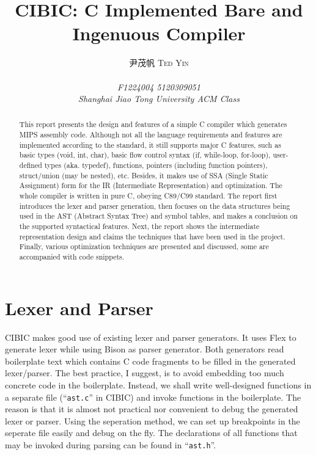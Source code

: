 \documentclass[10pt, a4paper]{article}
\begin{document}
\title{\Large{CIBIC: C Implemented Bare and Ingenuous Compiler}}

\author{\textsc{尹茂帆 Ted Yin}\\ \\
    {\centering\emph{F1224004 5120309051\\
Shanghai Jiao Tong University ACM Class}}}
\maketitle
\begin{abstract}
    This report presents the design and features of a simple C compiler which
    generates MIPS assembly code. Although not all the language requirements
    and features are implemented according to the standard, it still supports
    major C features, such as basic types (void, int, char), basic flow control
    syntax (if, while-loop, for-loop), user-defined types (aka. typedef),
    functions, pointers (including function pointers), struct/union (may be
    nested), etc. Besides, it makes use of SSA (Single Static Assignment) form
    for the IR (Intermediate Representation) and optimization. The whole compiler is
    written in pure C, obeying C89/C99 standard. The report first introduces
    the lexer and parser generation, then focuses on the data structures being
    used in the AST (Abstract Syntax Tree) and symbol tables, and makes a
    conclusion on the supported syntactical features. Next, the report shows
    the intermediate representation design and claims the techniques that have
    been used in the project. Finally, various optimization techniques are
    presented and discussed, some are accompanied with code snippets.
\end{abstract}
\section{Lexer and Parser}
CIBIC makes good use of existing lexer and parser generators. It uses Flex to
generate lexer while using Bison as parser generator. Both generators read
boilerplate text which contains C code fragments to be filled in the generated
lexer/parser. The best practice, I suggest, is to avoid embedding too much
concrete code in the boilerplate. Instead, we shall write well-designed
functions in a separate file (``\texttt{ast.c}'' in CIBIC) and invoke functions in the
boilerplate. The reason is that it is almost not practical nor convenient to
debug the generated lexer or parser. Using the seperation method, we can set up
breakpoints in the seperate file easily and debug on the fly. The declarations
of all functions that may be invoked during parsing can be found in ``\texttt{ast.h}''.
\end{document}
